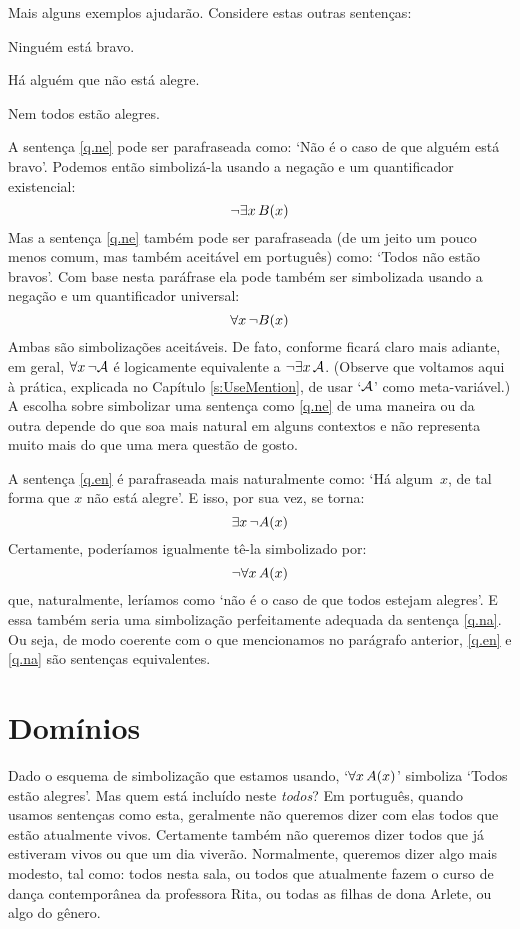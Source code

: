 Mais alguns exemplos ajudarão. Considere estas outras sentenças:
	\begin{earg}
		\item[\ex{q.ne}] Ninguém está bravo.
		\item[\ex{q.en}] Há alguém que não está alegre.
		\item[\ex{q.na}] Nem todos estão alegres.
	\end{earg}
A sentença \ref{q.ne} pode ser parafraseada como:
`Não é o caso de que alguém está bravo'.
Podemos então simbolizá-la usando a negação e um quantificador existencial:
$$\neg \exists x\,\mathord{B}(x)$$
Mas a sentença \ref{q.ne} também pode ser parafraseada (de um jeito um pouco menos comum, mas também aceitável em português) como:
`Todos não estão bravos'.
Com base nesta paráfrase ela pode também ser simbolizada usando a negação e um quantificador universal:
$$\forall x\, \neg \mathord{B}(x)$$
Ambas são simbolizações aceitáveis.
De fato, conforme ficará claro mais adiante, em geral, $\forall x\, \neg\mathcal{A}$ é logicamente equivalente a $\neg\exists x\,\mathcal{A}$.
(Observe que voltamos aqui à prática, explicada no Capítulo \ref{s:UseMention}, de usar `$\mathcal{A}$' como meta-variável.)
A escolha sobre simbolizar uma sentença como \ref{q.ne} de uma maneira ou da outra depende do que soa mais natural em alguns contextos e  não representa muito mais do que uma mera questão de gosto.

A sentença \ref{q.en} é parafraseada mais naturalmente como:
`Há algum~$x$, de tal forma que $x$ não está alegre'.
E isso, por sua vez, se torna:
$$\exists x\, \neg \mathord{A}(x)$$
Certamente, poderíamos igualmente tê-la simbolizado por:
$$\neg\forall x\,\mathord{A}(x)$$
que, naturalmente, leríamos como `não é o caso de que todos estejam alegres'.
E essa também seria uma simbolização perfeitamente adequada da sentença \ref{q.na}.
Ou seja, de modo coerente com o que mencionamos no parágrafo anterior, \ref{q.en} e \ref{q.na} são sentenças equivalentes.


\section{Domínios}
Dado o esquema de simbolização que estamos usando, `$\forall x\,\mathord{A}(x)$' simboliza `Todos estão alegres'.
Mas quem está incluído neste \emph{todos}?
Em português, quando usamos sentenças como esta, geralmente não queremos dizer com elas todos que estão atualmente vivos.
Certamente também não queremos dizer todos que já estiveram vivos ou que um dia viverão.
Normalmente, queremos dizer algo mais modesto, tal como:
todos nesta sala, ou todos que atualmente fazem o curso de dança contemporânea da professora Rita, ou todas as filhas de dona Arlete, ou algo do gênero.

